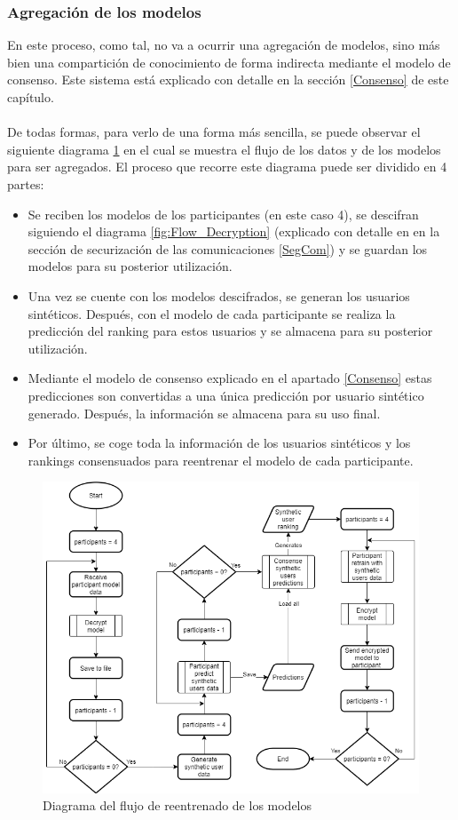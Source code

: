 \subsubsection{Agregación de los modelos}
En este proceso, como tal, no va a ocurrir una agregación de modelos, sino más bien una compartición de conocimiento de forma indirecta mediante el modelo de consenso. Este sistema está explicado con detalle en la sección \ref{Consenso} de este capítulo.
\\ \\
De todas formas, para verlo de una forma más sencilla, se puede observar el siguiente diagrama \ref{fig:Flow_Agregation} en el cual se muestra el flujo de los datos y de los modelos para ser agregados. El proceso que recorre este diagrama puede ser dividido en 4 partes:
\begin{itemize}
    \item Se reciben los modelos de los participantes (en este caso 4), se descifran siguiendo el diagrama \ref{fig:Flow_Decryption} (explicado con detalle en en la sección de securización de las comunicaciones \ref{SegCom}) y se guardan los modelos para su posterior utilización.
    \item Una vez se cuente con los modelos descifrados, se generan los usuarios sintéticos. Después, con el modelo de cada participante se realiza la predicción del ranking para estos usuarios y se almacena para su posterior utilización. 
    \item Mediante el modelo de consenso explicado en el apartado \ref{Consenso} estas predicciones son convertidas a una única predicción por usuario sintético generado. Después, la información se almacena para su uso final.
    \item Por último, se coge toda la información de los usuarios sintéticos y los rankings consensuados para reentrenar el modelo de cada participante. 
\end{itemize}
\begin{figure}[H]
    \centering
    \includegraphics[width=\textwidth]{Figuras/flowchart_agregation.png}    
    \caption{Diagrama del flujo de reentrenado de los modelos} 
    \label{fig:Flow_Agregation}
\end{figure}
\newpage
